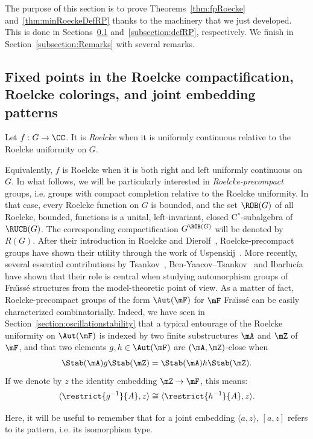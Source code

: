 The purpose of this section is to prove Theorems~\ref{thm:fpRoecke} and~\ref{thm:minRoeckeDefRP} thanks to the machinery that we just developed. This is done in Sections~\ref{subsection:Roelcke} and~\ref{subsection:defRP}, respectively. We finish in Section~\ref{subsection:Remarks} with several remarks.

\subsection{Fixed points in the Roelcke compactification, Roelcke colorings, and joint embedding patterns}
\label{subsection:Roelcke}

\begin{defi}
Let $f : G \rightarrow \CC$. It is \emph{Roelcke} when it is uniformly continuous relative to the Roelcke uniformity on $G$.
\end{defi}

Equivalently, $f$ is Roelcke when it is both right and left uniformly continuous on~$G$. In what follows, we will be particularly interested in \emph{Roelcke-precompact} groups, i.e. groups with compact completion relative to the Roelcke uniformity. In that case, every Roelcke function on $G$ is bounded, and the set $\ROB(G)$ of all Roelcke, bounded, functions is a unital, left-invariant, closed C$^{*}$-subalgebra of $\RUCB(G)$. The corresponding compactification $G^{\ROB(G)}$ will be denoted by $R(G)$. After their introduction in Roelcke and Dierolf~\cite{RD}, Roelcke-precompact groups have shown their utility through the work of Uspenskij~\cite{Us3, Us4, Us5}. More recently, several essential contributions by Tsankov~\cite{Ts}, Ben-Yaacov--Tsankov~\cite{BYT} and Ibarluc\'ia~\cite{I0, I1} have shown that their role is central when studying automorphism groups of Fra\"{\i}ss\'e structures from the model-theoretic point of view. As a matter of fact, Roelcke-precompact groups of the form $\Aut(\mF)$ for $\mF$ Fra\"{\i}ss\'e can be easily characterized combinatorially. Indeed, we have seen in Section~\ref{section:oscillationstability} that a typical entourage of the Roelcke uniformity on $\Aut(\mF)$ is indexed by two finite substructures $\mA$ and $\mZ$ of $\mF$, and that two elements $g,h\in \Aut(\mF)$ are $(\mA, \mZ)$-close when
\[
\Stab(\mA)g\Stab(\mZ)=\Stab(\mA)h\Stab(\mZ).
\]
If we denote by $z$ the identity embedding $\mZ\to \mF$, this means:
\[
\langle \restrict{g^{-1}}{A}, z \rangle\cong \langle \restrict{h^{-1}}{A}, z \rangle.
\]

Here, it will be useful to remember that for a joint embedding $\langle a,z\rangle$, $[a,z]$ refers to its pattern, i.e. its isomorphism type.

